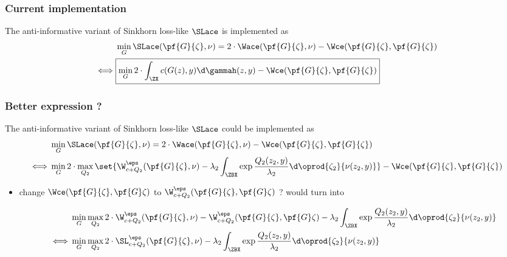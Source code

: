 \documentclass[11pt,a4paper]{article}
\begin{document}
\subsubsection{Current implementation}

The anti-informative variant of Sinkhorn loss-like $\SLace$ is implemented as
\begin{align}
    &\min_{G} \SLace(\pf{G}{\zeta}, \nu) = 2 \cdot \Wace(\pf{G}{\zeta}, \nu) - \Wce(\pf{G}{\zeta}, \pf{G}{\zeta}) \\%
\iff &\boxed{\min_{G} 2 \cdot \int_{\ZX}c(G(z), y) \d \gammah(z, y) - \Wce(\pf{G}{\zeta}, \pf{G}{\zeta})}
\end{align}

\subsubsection{Better expression ?}

The anti-informative variant of Sinkhorn loss-like $\SLace$ could be implemented as
\begin{align}
    &\min_{G} \SLace(\pf{G}{\zeta}, \nu) = 2 \cdot \Wace(\pf{G}{\zeta}, \nu) - \Wce(\pf{G}{\zeta}, \pf{G}{\zeta}) \\%
\iff &\min_{G} 2 \cdot \max_{Q_2}\set{ \W_{c + Q_2}^{\eps}(\pf{G}{\zeta}, \nu)- \lambda_2 \int_{\ZBX}{\exp{\frac{Q_2(z_2, y)}{\lambda_2}} \d \oprod{\zeta_2 }{\nu (z_2, y)}}} - \Wce(\pf{G}{\zeta}, \pf{G}{\zeta})
\end{align}

\begin{rems}
    \begin{itemize}
        \item change $\Wce(\pf{G}{\zeta}, \pf{G}\zeta)$ to $\W_{c+Q_2}^{\eps}(\pf{G}{\zeta}, \pf{G}\zeta)$ ? would turn into

\begin{align}
    &\min_{G} \max_{Q_2} 2 \cdot\W_{c + Q_2}^{\eps}(\pf{G}{\zeta}, \nu)- \W_{c+Q_2}^{\eps}(\pf{G}{\zeta}, \pf{G}\zeta) - \lambda_2 \int_{\ZBX}{\exp{\frac{Q_2(z_2, y)}{\lambda_2}} \d \oprod{\zeta_2 }{\nu (z_2, y)}} \\
    \iff & \min_{G}\max_{Q_2} 2 \cdot \SL_{c+Q_2}^{\eps}(\pf{G}{\zeta}, \nu)- \lambda_2 \int_{\ZBX}{\exp{\frac{Q_2(z_2, y)}{\lambda_2}} \d \oprod{\zeta_2 }{\nu (z_2, y)}}
\end{align}
    \end{itemize}
\end{rems}

% 
% 
% 
% 
% 
% 
% 
% 
% 

\printbibliography{}
\end{document}
